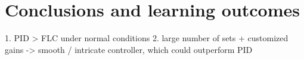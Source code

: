 \section{Conclusions and learning outcomes}

1. PID > FLC under normal conditions
2. large number of sets + customized gains -> smooth / intricate controller, which could outperform PID